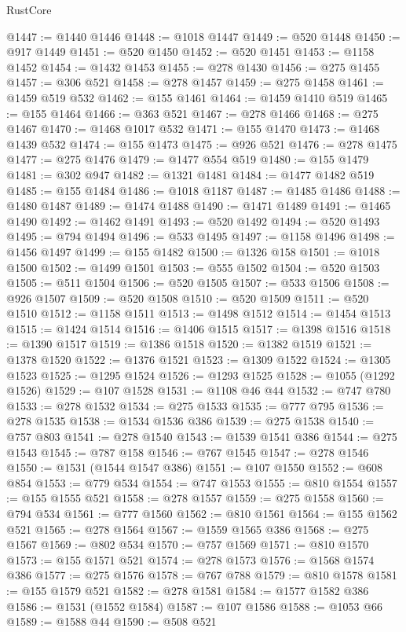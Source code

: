 \begin{lexlean}{RustCore}
\begin{coremodule}
@1447 := @1440 @1446
@1448 := @1018 @1447
@1449 := @520 @1448
@1450 := @917 @1449
@1451 := @520 @1450
@1452 := @520 @1451
@1453 := @1158 @1452
@1454 := @1432 @1453
@1455 := @278 @1430
@1456 := @275 @1455
@1457 := @306 @521
@1458 := @278 @1457
@1459 := @275 @1458
@1461 := @1459 @519 @532
@1462 := @155 @1461
@1464 := @1459 @1410 @519
@1465 := @155 @1464
@1466 := @363 @521
@1467 := @278 @1466
@1468 := @275 @1467
@1470 := @1468 @1017 @532
@1471 := @155 @1470
@1473 := @1468 @1439 @532
@1474 := @155 @1473
@1475 := @926 @521
@1476 := @278 @1475
@1477 := @275 @1476
@1479 := @1477 @554 @519
@1480 := @155 @1479
@1481 := @302 @947
@1482 := @1321 @1481
@1484 := @1477 @1482 @519
@1485 := @155 @1484
@1486 := @1018 @1187
@1487 := @1485 @1486
@1488 := @1480 @1487
@1489 := @1474 @1488
@1490 := @1471 @1489
@1491 := @1465 @1490
@1492 := @1462 @1491
@1493 := @520 @1492
@1494 := @520 @1493
@1495 := @794 @1494
@1496 := @533 @1495
@1497 := @1158 @1496
@1498 := @1456 @1497
@1499 := @155 @1482
@1500 := @1326 @158
@1501 := @1018 @1500
@1502 := @1499 @1501
@1503 := @555 @1502
@1504 := @520 @1503
@1505 := @511 @1504
@1506 := @520 @1505
@1507 := @533 @1506
@1508 := @926 @1507
@1509 := @520 @1508
@1510 := @520 @1509
@1511 := @520 @1510
@1512 := @1158 @1511
@1513 := @1498 @1512
@1514 := @1454 @1513
@1515 := @1424 @1514
@1516 := @1406 @1515
@1517 := @1398 @1516
@1518 := @1390 @1517
@1519 := @1386 @1518
@1520 := @1382 @1519
@1521 := @1378 @1520
@1522 := @1376 @1521
@1523 := @1309 @1522
@1524 := @1305 @1523
@1525 := @1295 @1524
@1526 := @1293 @1525
@1528 := @1055 (@1292 @1526)
@1529 := @107 @1528
@1531 := @1108 @46 @44
@1532 := @747 @780
@1533 := @278 @1532
@1534 := @275 @1533
@1535 := @777 @795
@1536 := @278 @1535
@1538 := @1534 @1536 @386
@1539 := @275 @1538
@1540 := @757 @803
@1541 := @278 @1540
@1543 := @1539 @1541 @386
@1544 := @275 @1543
@1545 := @787 @158
@1546 := @767 @1545
@1547 := @278 @1546
@1550 := @1531 (@1544 @1547 @386)
@1551 := @107 @1550
@1552 := @608 @854
@1553 := @779 @534
@1554 := @747 @1553
@1555 := @810 @1554
@1557 := @155 @1555 @521
@1558 := @278 @1557
@1559 := @275 @1558
@1560 := @794 @534
@1561 := @777 @1560
@1562 := @810 @1561
@1564 := @155 @1562 @521
@1565 := @278 @1564
@1567 := @1559 @1565 @386
@1568 := @275 @1567
@1569 := @802 @534
@1570 := @757 @1569
@1571 := @810 @1570
@1573 := @155 @1571 @521
@1574 := @278 @1573
@1576 := @1568 @1574 @386
@1577 := @275 @1576
@1578 := @767 @788
@1579 := @810 @1578
@1581 := @155 @1579 @521
@1582 := @278 @1581
@1584 := @1577 @1582 @386
@1586 := @1531 (@1552 @1584)
@1587 := @107 @1586
@1588 := @1053 @66
@1589 := @1588 @44
@1590 := @508 @521

\end{coremodule}
\end{lexlean}
